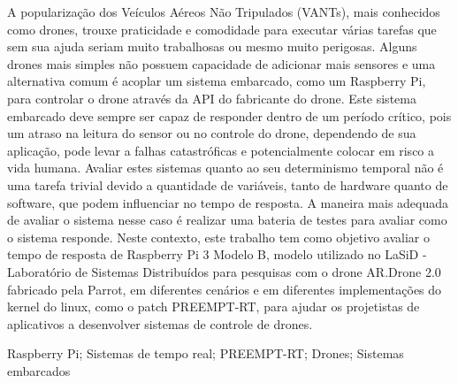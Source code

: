 \resumo
A popularização dos Veículos Aéreos Não Tripulados (VANTs), mais conhecidos como drones, trouxe praticidade e comodidade para executar várias tarefas que sem sua ajuda seriam muito trabalhosas ou mesmo muito perigosas. Alguns drones mais simples não possuem capacidade de adicionar mais sensores e uma alternativa comum é acoplar um sistema embarcado, como um Raspberry Pi, para controlar o drone através da API do fabricante do drone. Este sistema embarcado deve sempre ser capaz de responder dentro de um período crítico, pois um atraso na leitura do sensor ou no controle do drone, dependendo de sua aplicação, pode levar a falhas catastróficas e potencialmente colocar em risco a vida humana. Avaliar estes sistemas quanto ao seu determinismo temporal não é uma tarefa trivial devido a quantidade de variáveis, tanto de hardware quanto de software, que podem influenciar no tempo de resposta. A maneira mais adequada de avaliar o sistema nesse caso é realizar uma bateria de testes para avaliar como o sistema responde. Neste contexto, este trabalho tem como objetivo avaliar o tempo de resposta de Raspberry Pi 3 Modelo B, modelo utilizado no LaSiD - Laboratório de Sistemas Distribuídos para pesquisas com o drone AR.Drone 2.0 fabricado pela Parrot, em diferentes cenários e em diferentes implementações do kernel do linux, como o patch PREEMPT-RT, para ajudar os projetistas de aplicativos a desenvolver sistemas de controle de drones.

\begin{keywords}
Raspberry Pi; Sistemas de tempo real; PREEMPT-RT; Drones; Sistemas embarcados
\end{keywords}
